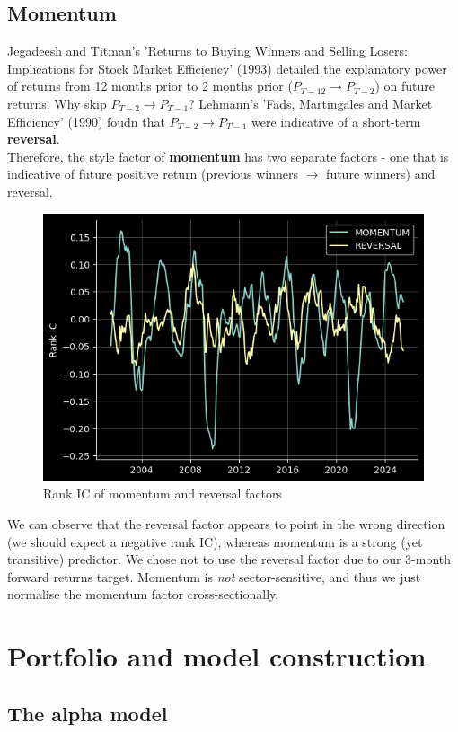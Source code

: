 \documentclass[12pt]{article}
\begin{document}
\subsection{Momentum}
Jegadeesh and Titman's 'Returns to Buying Winners and Selling Losers: Implications for Stock Market Efficiency' (1993) detailed the explanatory power of returns from 12 months prior to 2 months prior ($P_{T-12} \to P_{T-2}$) on future returns. Why skip $P_{T-2} \to P_{T-1}$? Lehmann's 'Fads, Martingales and Market Efficiency' (1990) foudn that $P_{T-2} \to P_{T-1}$ were indicative of a short-term \textbf{reversal}.
\newline \\
Therefore, the style factor of \textbf{momentum} has two separate factors - one that is indicative of 
future positive return (previous winners $\to$ future winners) and reversal.
\begin{figure}[H]
    \centering
    \includegraphics[width=13cm]{./static/momentum_rank_ic.png}
    \caption{Rank IC of momentum and reversal factors}
    \label{fig:momentum_rank_ic}
\end{figure}
We can observe that the reversal factor appears to point in the wrong direction (we should expect a negative 
rank IC), whereas momentum is a strong (yet transitive) predictor. We chose not to use the reversal factor 
due to our 3-month forward returns target. Momentum is \textit{not} sector-sensitive, and thus we just 
normalise the momentum factor cross-sectionally.
\newpage
\section{Portfolio and model construction}
\subsection{The alpha model}
\end{document}
